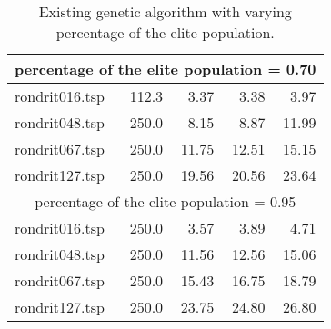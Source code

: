 \begin{table}[H]
{\begin{tabular}{l rrrr}
\midrule
\multicolumn{5}{c}{percentage of the elite population = 0.70}\\ 
\midrule
rondrit016.tsp & 112.3 & 3.37 & 3.38 & 3.97 \\
rondrit048.tsp & 250.0 & 8.15 & 8.87 & 11.99 \\
rondrit067.tsp & 250.0 & 11.75 & 12.51 & 15.15 \\
rondrit127.tsp & 250.0 & 19.56 & 20.56 & 23.64 \\
\midrule
\multicolumn{5}{c}{percentage of the elite population = 0.95}\\ 
\midrule
rondrit016.tsp & 250.0 & 3.57 & 3.89 & 4.71 \\
rondrit048.tsp & 250.0 & 11.56 & 12.56 & 15.06 \\
rondrit067.tsp & 250.0 & 15.43 & 16.75 & 18.79 \\
rondrit127.tsp & 250.0 & 23.75 & 24.80 & 26.80 \\
\bottomrule 
\end{tabular} 
}
\caption{Existing genetic algorithm with varying percentage of the elite population.}
\label{tab:vary_elitism}
\end{table}
